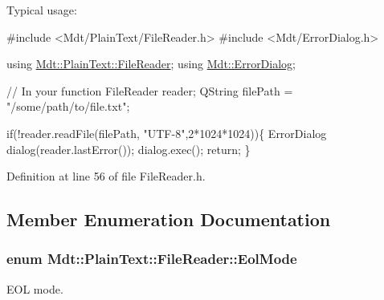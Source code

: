 Typical usage\+: 
\begin{DoxyCode}
\textcolor{preprocessor}{#include <Mdt/PlainText/FileReader.h>}
\textcolor{preprocessor}{#include <Mdt/ErrorDialog.h>}

\textcolor{keyword}{using} \hyperlink{class_mdt_1_1_plain_text_1_1_file_reader}{Mdt::PlainText::FileReader};
\textcolor{keyword}{using} \hyperlink{class_mdt_1_1_error_dialog}{Mdt::ErrorDialog};

\textcolor{comment}{// In your function}
FileReader reader;
QString filePath = \textcolor{stringliteral}{"/some/path/to/file.txt"};

\textcolor{keywordflow}{if}(!reader.readFile(filePath, \textcolor{stringliteral}{"UTF-8"},2*1024*1024))\{
  ErrorDialog dialog(reader.lastError());
  dialog.exec();
  \textcolor{keywordflow}{return};
\}
\end{DoxyCode}
 

Definition at line 56 of file File\+Reader.\+h.



\subsection{Member Enumeration Documentation}
\subsubsection[{\texorpdfstring{Eol\+Mode}{EolMode}}]{\setlength{\rightskip}{0pt plus 5cm}enum {\bf Mdt\+::\+Plain\+Text\+::\+File\+Reader\+::\+Eol\+Mode}}\hypertarget{class_mdt_1_1_plain_text_1_1_file_reader_ad9b4b7e046f899c9d13e19434d68ef10}{}\label{class_mdt_1_1_plain_text_1_1_file_reader_ad9b4b7e046f899c9d13e19434d68ef10}


E\+OL mode. 

